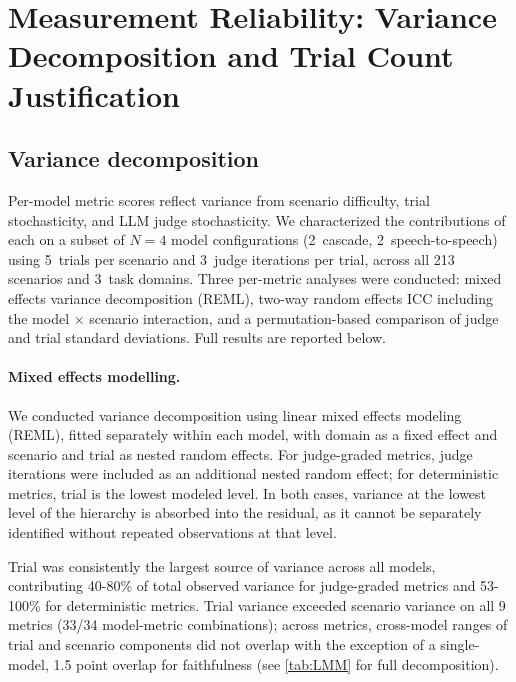 \clearpage
\section{Measurement Reliability: Variance Decomposition and Trial Count Justification}
\label{app:statistics}

\subsection{Variance decomposition}

Per-model metric scores reflect variance from scenario difficulty, trial stochasticity, and LLM judge stochasticity. We characterized the contributions of each on a subset of $N=4$ model configurations (2~cascade, 2~speech-to-speech) using 5~trials per scenario and 3~judge iterations per trial, across all 213 scenarios and 3~task domains. Three per-metric analyses were conducted: mixed effects variance decomposition (REML), two-way random effects ICC including the model $\times$ scenario interaction, and a permutation-based comparison of judge and trial standard deviations. Full results are reported below.

\paragraph{Mixed effects modelling.} We conducted variance decomposition using linear mixed effects modeling (REML), fitted separately within each model, with domain as a fixed effect and scenario and trial as nested random effects. For judge-graded metrics, judge iterations were included as an additional nested random effect; for deterministic metrics, trial is the lowest modeled level. In both cases, variance at the lowest level of the hierarchy is absorbed into the residual, as it cannot be separately identified without repeated observations at that level.

Trial was consistently the largest source of variance across all models, contributing 40-80\% of total observed variance for judge-graded metrics and 53-100\% for deterministic metrics. Trial variance exceeded scenario variance on all 9 metrics (33/34 model-metric combinations); across metrics, cross-model ranges of trial and scenario components did not overlap with the exception of a single-model, 1.5 point overlap for faithfulness (see \autoref{tab:LMM} for full decomposition). 

